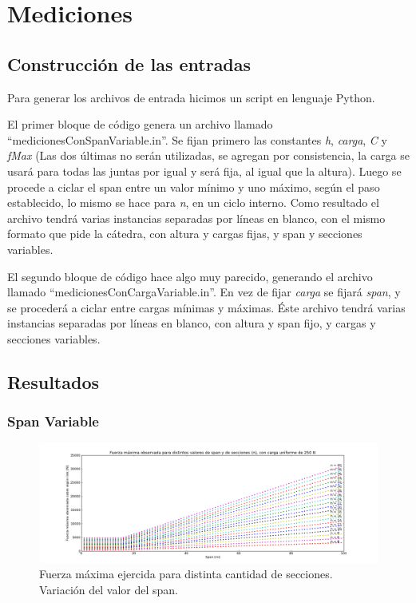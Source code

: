 \section{Mediciones}

\subsection{Construcción de las entradas}

Para generar los archivos de entrada hicimos un script en lenguaje Python.

El primer bloque de código genera un archivo llamado ``medicionesConSpanVariable.in''. Se fijan primero las constantes \emph{h}, \emph{carga}, \emph{C} y \emph{fMax}
(Las dos últimas no serán utilizadas, se agregan por consistencia, la carga se usará para todas las juntas por igual y será fija, al igual que la altura). 
Luego se procede a ciclar el span entre un valor mínimo y uno máximo, según el paso establecido, lo mismo se hace para \emph{n}, en un ciclo interno. 
Como resultado el archivo tendrá varias instancias separadas por líneas en blanco, con el mismo formato que pide la cátedra, con altura y cargas fijas, y span y secciones variables.

El segundo bloque de código hace algo muy parecido, generando el archivo llamado ``medicionesConCargaVariable.in''. En vez de fijar \emph{carga} se fijará \emph{span}, y se
procederá a ciclar entre cargas mínimas y máximas.
Éste archivo tendrá varias instancias separadas por líneas en blanco, con altura y span fijo, y cargas y secciones variables.

\subsection{Resultados}

\subsubsection{Span Variable}

\begin{figure}[H]
  \centering
    \includegraphics[width=\textwidth]{../mediciones/spanVariableDic.png}
    \caption{Fuerza máxima ejercida para distinta cantidad de secciones. Variación del valor del span.}
    \label{graf:span}
\end{figure}

